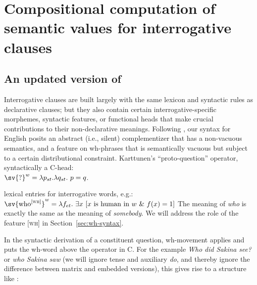 \section{Compositional computation of semantic values for interrogative clauses}
\label{sec:compositional-interrogative}

\subsection{An updated version of \cite{karttunen-1977-questions}}%
\label{sec:karttunen-1977}

Interrogative clauses are built largely with the same lexicon and syntactic
rules as declarative clauses; but they also contain certain
interrogative-specific morphemes, syntactic features, or functional heads that
make crucial contributions to their non-declarative meanings. Following
\cite{karttunen-1977-questions}, our syntax for English posits an abstract
(i.e., silent) complementizer that has a non-vacuous semantics, and a feature on
wh-phrases that is semantically vacuous but subject to a certain distributional
constraint.
%
%
\ex\label{ex:?}%
Karttunen's ``proto-question'' operator, syntactically a C-head:\\
$\sv{?}^{w} = \lambda p_{st}.\lambda q_{st}.\ p=q$.
\xe

\ex lexical entries for interrogative words, e.g.:\\
$\sv{\text{who}^{[\textsc{wh}]}}^{w} = \lambda f_{et}.\ \exists x\ [x\ \text{is
  human in}\ w\ \&\ f(x)=1]$
\xe
%
The meaning of \emph{who} is exactly the same as the meaning of \emph{somebody}.
We will address the role of the feature [\textsc{wh}] in
Section~\ref{sec:wh-syntax}.

In the syntactic derivation of a constituent question, wh-movement applies and
puts the wh-word above the operator in C. For the example \emph{Who did Sakina
  see?} or \emph{who Sakina saw} (we will ignore tense and auxiliary \emph{do},
and thereby ignore the difference between matrix and embedded versions), this
gives rise to a structure like \Next:

